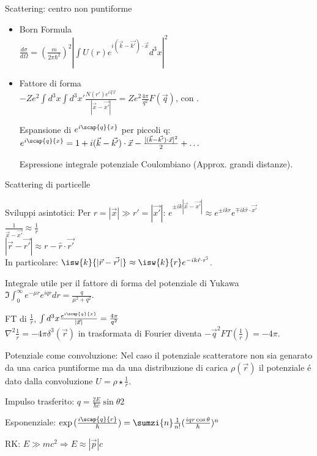 \begin{frame}{Scattering: centro non puntiforme}
    
     \begin{itemize}

\item Born Formula\\
$\frac{d\sigma}{d\Omega}=(\frac{m}{2\pi\hbar^2})^2|\int U(r)e^{i(\vec{k}-\vec{k'})\cdot\vec{x}}d^3x|^2$


\item  Fattore di forma\\
$-Ze^2\int d^3x\int d^3x'\frac{N(r')e^{i\vec{q}\vec{x}}}{|\vec{x}-\vec{x'}|}=Ze^2\frac{4\pi}{q^2}F(\vec{q})$, con .

Espansione di $e^{i\scap{q}{x}}$ per piccoli q:
$e^{i\scap{q}{x}}=1+i(\vec{k}-\vec{k'})\cdot\vec{x}-\frac{[(\vec{k}-\vec{k'})\cdot\vec{x}]^2}{2}+\ldots$

Espressione integrale potenziale Coulombiano (Approx. grandi distanze).






 \end{itemize}

\end{frame}

\begin{wordonframe}{Scattering di particelle}
 
Sviluppi asintotici:
Per $r=|\vec{x}|\gg r'=|\vec{x'}|$: $e^{\pm ik|\vec{x}-\vec{x'}|}\approx e^{\pm ikr}e^{\mp ik\hat{r}\cdot\vec{x'}}$\\
$\frac{1}{\vec{x}-\vec{x'}}\approx\frac{1}{r}$\\
$|\vec{r}-\vec{r'}|\approx r-\hat{r}\cdot\vec{r'}$\\
In particolare: $\isw{k}{|\vec{r}-\vec{r'}|}\approx\isw{k}{r}e^{-ik\hat{r}\cdot\vec{r'}}$.

Integrale utile per il fattore di forma del potenziale di Yukawa
$\Im{\int_0^{\infty}e^{-\mu r}e^{iqr}dr}=\frac{q}{\mu^2+q^2}$.

FT di $\frac{1}{r}$,
$\int d^3x\frac{e^{i\scap{q}{x}}}{|\vec{x}|}=\frac{4\pi}{q^2}$\\
$\nabla^2\frac{1}{r}=-4\pi\delta^3(\vec{r})$ in trasformata di Fourier diventa $-\vec{q}^2FT(\frac{1}{r})=-4\pi$.

Potenziale come convoluzione: Nel caso il potenziale scatteratore non sia genarato da una carica puntiforme  ma da una distribuzione di carica $\rho(\vec{r})$  il potenziale \'e dato dalla convoluzione $U=\rho\star\frac{1}{r}$.

Impulso trasferito: $q=\frac{2E}{\hbar c}\sin{\theta}{2}$

Esponenziale: $\exp{(\frac{i\scap{q}{r}}{\hbar})}=\sumzi{n}\frac{1}{n!}(\frac{iqr\cos{\theta}}{\hbar})^n$

RK: $E\gg mc^2\Rightarrow E\approx|\vec{p}|c$

\end{wordonframe}

